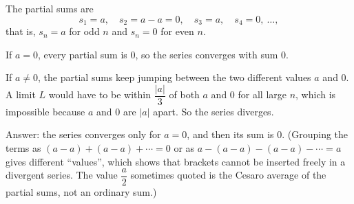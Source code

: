 The partial sums are
\[
s_1=a,\quad s_2=a-a=0,\quad s_3=a,\quad s_4=0,\ \dots,
\]
that is, $s_n=a$ for odd $n$ and $s_n=0$ for even $n$.

If $a=0$, every partial sum is $0$, so the series converges with sum $0$.

If $a\ne0$, the partial sums keep jumping between the two different values $a$ and $0$. A limit $L$ would have to be within $\dfrac{|a|}{3}$ of both $a$ and $0$ for all large $n$, which is impossible because $a$ and $0$ are $|a|$ apart. So the series diverges.

Answer: the series converges only for $\boxed{a=0}$, and then its sum is $0$. (Grouping the terms as $(a-a)+(a-a)+\cdots=0$ or as $a-(a-a)-(a-a)-\cdots=a$ gives different ``values'', which shows that brackets cannot be inserted freely in a divergent series. The value $\dfrac {a}{2}$ sometimes quoted is the Cesaro average of the partial sums, not an ordinary sum.)
